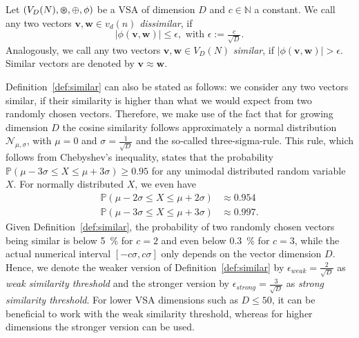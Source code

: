 \begin{defn}
	\label{def:similar}
	Let $(V_{D}(N), \varoast, \oplus, \phi)$ be a \acrfull{VSA} of dimension $D$ and $c \in \mathbb{N}$ a constant. We call any two vectors $ \mathbf{v}, \mathbf{w} \in v_{d}(n)$ \emph{dissimilar}, if
    \begin{equation}
    \label{eq:dissmilar}
	\left| \phi( \mathbf{v}, \mathbf{w}) \right| \leq \epsilon, \textrm{ with } \epsilon:=\tfrac{c}{\sqrt{D}}.
    \end{equation}
	Analogously, we call any two vectors $ \mathbf{v}, \mathbf{w} \in V_{D}(N)$ \emph{similar}, if	$\left| \phi( \mathbf{v}, \mathbf{w}) \right| > \epsilon$.
	Similar vectors are denoted by $ \mathbf{v} \approx \mathbf{w}$. 
\end{defn}
Definition~\ref{def:similar} can also be stated as follows: we consider any two vectors similar, if their similarity is higher than what we would expect from two randomly chosen vectors.
Therefore, we make use of the fact that for growing dimension $D$ the cosine similarity follows approximately a normal distribution $\mathcal{N}_{\mu, \sigma}$, with $\mu=0$ and $\sigma=\tfrac{1}{\sqrt{D}}$ and the so-called three-sigma-rule.
This rule, which follows from Chebyshev's inequality, states that the probability $\mathbb{P}\left(\mu-3\sigma \leq X \leq \mu+3\sigma \right) \geq 0.95$ for any unimodal distributed random variable $X$.
For normally distributed $X$, we even have
\begin{align*}
	\mathbb{P}\left(\mu-2\sigma \leq X \leq \mu+2\sigma \right) &\approx 0.954 \\
	\mathbb{P}\left(\mu-3\sigma \leq X \leq \mu+3\sigma \right) &\approx 0.997.
\end{align*}
Given Definition~\ref{def:similar}, the probability of two randomly chosen vectors being similar is below \SI{5}{\percent} for $c=2$ and even below \SI{0.3}{\percent} for $c=3$, while the actual numerical interval $\left[-c\sigma, c\sigma\right]$ only depends on the vector dimension $D$.
Hence, we denote the weaker version of Definition~\ref{def:similar} by $\epsilon_{weak} = \tfrac{2}{\sqrt{D}}$ as \emph{weak similarity threshold} and the stronger version by $\epsilon_{strong} = \tfrac{3}{\sqrt{D}}$ as \emph{strong similarity threshold}.
For lower \ac{VSA} dimensions such as $D \leq 50$, it can be beneficial to work with the weak similarity threshold, whereas for higher dimensions the stronger version can be used.

